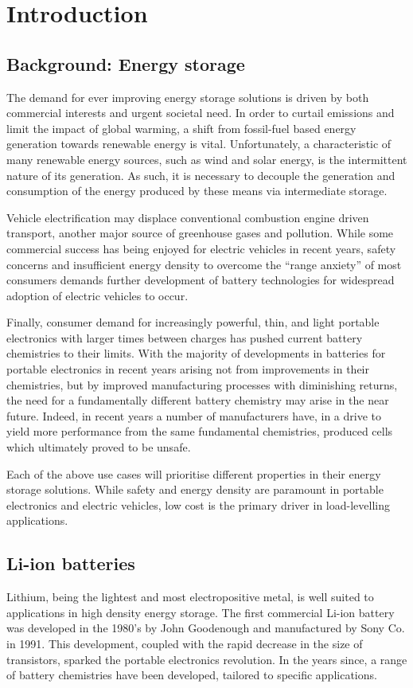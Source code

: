 \chapter{Introduction}
\section{Background: Energy storage}
The demand for ever improving energy storage solutions is driven by both commercial interests and urgent societal need.
In order to curtail  emissions and limit the impact of global warming, a shift from fossil-fuel based energy generation towards renewable energy is vital.\cite{Goodenough2013}
Unfortunately, a characteristic of many renewable energy sources, such as wind and solar energy, is the intermittent nature of its generation.\cite{Goodenough2010a}
As such, it is necessary to decouple the generation and consumption of the energy produced by these means via intermediate storage.

Vehicle electrification may displace conventional combustion engine driven transport, another major source of greenhouse gases and pollution.
While some commercial success has being enjoyed for electric vehicles in recent years, safety concerns and insufficient energy density to overcome the ``range anxiety'' of most consumers demands further development of battery technologies for widespread adoption of electric vehicles to occur.

Finally, consumer demand for increasingly powerful, thin, and light portable electronics with larger times between charges has pushed current battery chemistries to their limits.
With the majority of developments in batteries for portable electronics in recent years arising not from improvements in their chemistries, but by improved manufacturing processes with diminishing returns, the need for a fundamentally different battery chemistry may arise in the near future.
Indeed, in recent years a number of manufacturers have, in a drive to yield more performance from the same fundamental chemistries, produced cells which ultimately proved to be unsafe.\cite{Loveridge2018}

Each of the above use cases will prioritise different properties in their energy storage solutions. 
While safety and energy density are paramount in portable electronics and electric vehicles, low cost is the primary driver in load-levelling applications.


\section{Li-ion batteries}
\renewcommand{\thefootnote}{\fnsymbol{footnote}}
Lithium, being the lightest and most electropositive metal, is well suited to applications in high density energy storage.
The first commercial Li-ion battery was developed in the 1980's by John Goodenough\cite{Mizushima1981} and manufactured by Sony Co. in 1991.\cite{Li2018}
This development, coupled with the rapid decrease in the size of transistors, sparked the portable electronics revolution.
In the years since, a range of battery chemistries have been developed, tailored to specific applications.

